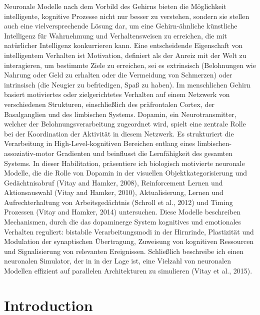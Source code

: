 \documentclass[
  11pt,
  a4paper,
]{scrbook}
\begin{document}
Neuronale Modelle nach dem Vorbild des Gehirns bieten die Möglichkeit
intelligente, kognitive Prozesse nicht nur besser zu verstehen, sondern
sie stellen auch eine vielversprechende Lösung dar, um eine
Gehirn-ähnliche künstliche Intelligenz für Wahrnehmung und
Verhaltensweisen zu erreichen, die mit natürlicher Intelligenz
konkurrieren kann. Eine entscheidende Eigenschaft von intelligentem
Verhalten ist Motivation, definiert als der Anreiz mit der Welt zu
interagieren, um bestimmte Ziele zu erreichen, sei es extrinsisch
(Belohnungen wie Nahrung oder Geld zu erhalten oder die Vermeidung von
Schmerzen) oder intrinsisch (die Neugier zu befriedigen, Spaß zu haben).
Im menschlichen Gehirn basiert motiviertes oder zielgerichtetes
Verhalten auf einem Netzwerk von verschiedenen Strukturen,
einschließlich des präfrontalen Cortex, der Basalganglien und des
limbischen Systems. Dopamin, ein Neurotransmitter, welcher der
Belohnungsverarbeitung zugeordnet wird, spielt eine zentrale Rolle bei
der Koordination der Aktivität in diesem Netzwerk. Es strukturiert die
Verarbeitung in High-Level-kognitiven Bereichen entlang eines
limbischen-assoziativ-motor Gradienten und beinflusst die Lernfähigkeit
des gesamten Systems. In dieser Habilitation, präsentiere ich biologisch
motivierte neuronale Modelle, die die Rolle von Dopamin in der visuellen
Objektkategorisierung und Gedächtnisabruf (Vitay and Hamker, 2008),
Reinforcement Lernen und Aktionsauswahl (Vitay and Hamker, 2010),
Aktualisierung, Lernen und Aufrechterhaltung von Arbeitsgedächtnis
(Schroll et al., 2012) und Timing Prozessen (Vitay and Hamker, 2014)
untersuchen. Diese Modelle beschreiben Mechanismen, durch die das
dopaminerge System kognitives und emotionales Verhalten reguliert:
bistabile Verarbeitungsmodi in der Hirnrinde, Plastizität und Modulation
der synaptischen Übertragung, Zuweisung von kognitiven Ressourcen und
Signalisierung von relevanten Ereignissen. Schließlich beschreibe ich
einen neuronalen Simulator, der in in der Lage ist, eine Vielzahl von
neuronalen Modellen effizient auf parallelen Architekturen zu simulieren
(Vitay et al., 2015).


\chapter{Introduction}\label{sec:Introduction}
\end{document}
